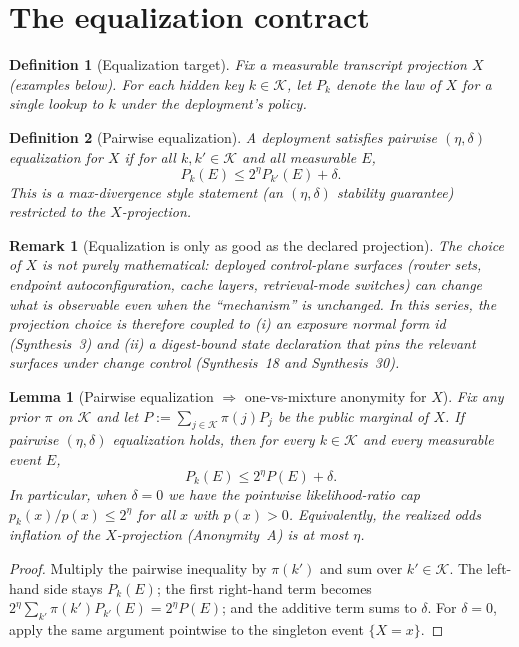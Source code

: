 \documentclass[11pt]{article}
\newtheorem{definition}{Definition}
\newtheorem{lemma}{Lemma}
\newtheorem{remark}{Remark}
\begin{document}
\section{The equalization contract}
\begin{definition}[Equalization target]
Fix a measurable transcript projection $X$ (examples below).
For each hidden key $k\in\mathcal K$, let $P_k$ denote the law of $X$ for a single lookup to $k$ under the deployment's policy.
\end{definition}

\begin{definition}[Pairwise equalization]
A deployment satisfies \emph{pairwise $(\eta,\delta)$ equalization} for $X$ if for all $k,k'\in\mathcal K$ and all measurable $E$,
\[
P_k(E)\le 2^{\eta}P_{k'}(E)+\delta.
\]
This is a max-divergence style statement (an $(\eta,\delta)$ stability guarantee) restricted to the $X$-projection.
\end{definition}


\begin{remark}[Equalization is only as good as the declared projection]
The choice of $X$ is not purely mathematical: deployed control-plane surfaces (router sets, endpoint autoconfiguration, cache layers, retrieval-mode switches) can change what is observable even when the ``mechanism'' is unchanged.
In this series, the projection choice is therefore coupled to (i) an exposure normal form id (Synthesis~3) and (ii) a digest-bound state declaration that pins the relevant surfaces under change control (Synthesis~18 and Synthesis~30).\cite{series:traceifaces,series:planstateequiv,series:deployedsurfaces}
\end{remark}
\begin{lemma}[Pairwise equalization $\Rightarrow$ one-vs-mixture anonymity for $X$]
\label{lem:pairwise-to-mixture}
Fix any prior $\pi$ on $\mathcal K$ and let $P:=\sum_{j\in\mathcal K}\pi(j)P_j$ be the public marginal of $X$.
If pairwise $(\eta,\delta)$ equalization holds, then for every $k\in\mathcal K$ and every measurable event $E$,
\[
P_k(E)\le 2^{\eta}P(E)+\delta.
\]
In particular, when $\delta=0$ we have the pointwise likelihood-ratio cap $p_k(x)/p(x)\le 2^{\eta}$ for all $x$ with $p(x)>0$.
Equivalently, the realized odds inflation of the $X$-projection (Anonymity~A) is at most $\eta$.
\end{lemma}

\begin{proof}
Multiply the pairwise inequality by $\pi(k')$ and sum over $k'\in\mathcal K$.
The left-hand side stays $P_k(E)$; the first right-hand term becomes $2^{\eta}\sum_{k'}\pi(k')P_{k'}(E)=2^{\eta}P(E)$; and the additive term sums to $\delta$.
For $\delta=0$, apply the same argument pointwise to the singleton event $\{X=x\}$.
\end{proof}
\end{document}
